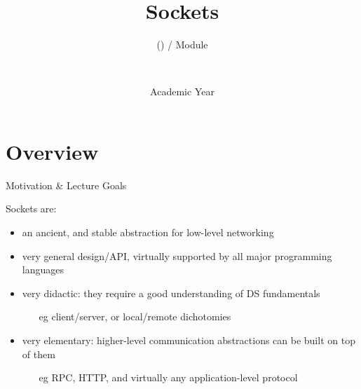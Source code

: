 \documentclass[presentation]{beamer}\mode<presentation>{\usetheme{AMSBolognaFC}}
\title[\currentLab{} -- Sockets]{Sockets}
\subtitle{\courseName{} (\courseAcronym) / Module \moduleN{}}
\author[\sspeaker{\gcShort} \& \mmShort]{
	\speaker{\gcFull} \and \mmFull
	\\ 
	\gcEmail \and \mmEmail
}
\institute[\disiShort, \uniboShort]{\disi{} (\disiShort)\\\unibo}
\date[A.Y. \academicYear{}]{Academic Year \academicYear{}}
\begin{document}

\frame{\titlepage}

\section{Overview}

\begin{frame}[c]{Motivation \& Lecture Goals}

Sockets are:
%
\begin{itemize}
	\item an ancient, and stable abstraction for low-level networking

	\vfill

	\item very general design/API, virtually supported by all major programming languages

	\vfill

	\item very didactic: they require a good understanding of DS fundamentals
    \begin{itemize}
        \item[eg] client/server, or local/remote dichotomies
    \end{itemize}

	\vfill

	\item very elementary: higher-level communication abstractions can be built on top of them
	\begin{itemize}
		\item[eg] RPC, HTTP, and virtually any application-level protocol
	\end{itemize}
\end{itemize}

\end{frame}
\end{document}
